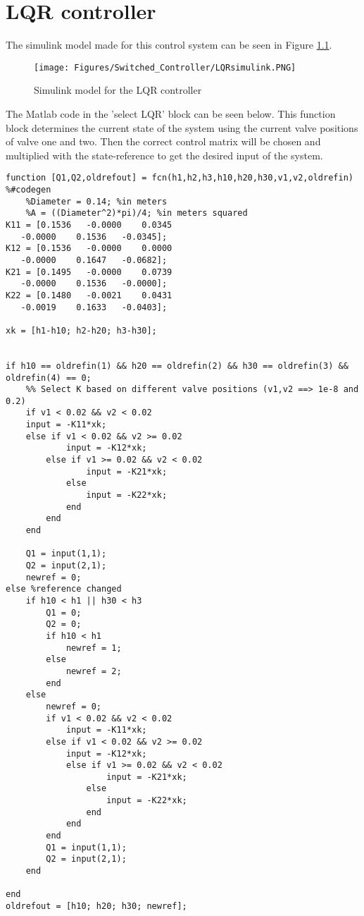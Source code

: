 \chapter{LQR controller} \label{App:LQR}
The simulink model made for this control system can be seen in Figure \ref{fig:LQRsim}.

\begin{figure} [H]
  \begin{center}
    \texttt{[image: Figures/Switched\_Controller/LQRsimulink.PNG]}
    \caption{Simulink model for the LQR controller}
    \label{fig:LQRsim}
  \end{center}
\end{figure}

The Matlab code in the 'select LQR' block can be seen below. This function block determines the current state of the system using the current valve positions of valve one and two. Then the correct control matrix will be chosen and multiplied with the state-reference to get the desired input of the system.

\begin{lstlisting}
function [Q1,Q2,oldrefout] = fcn(h1,h2,h3,h10,h20,h30,v1,v2,oldrefin)
%#codegen
    %Diameter = 0.14; %in meters
    %A = ((Diameter^2)*pi)/4; %in meters squared
K11 = [0.1536   -0.0000    0.0345
   -0.0000    0.1536   -0.0345];
K12 = [0.1536   -0.0000    0.0000
   -0.0000    0.1647   -0.0682];
K21 = [0.1495   -0.0000    0.0739
   -0.0000    0.1536   -0.0000];
K22 = [0.1480   -0.0021    0.0431
   -0.0019    0.1633   -0.0403];

xk = [h1-h10; h2-h20; h3-h30];


if h10 == oldrefin(1) && h20 == oldrefin(2) && h30 == oldrefin(3) && oldrefin(4) == 0;
    %% Select K based on different valve positions (v1,v2 ==> 1e-8 and 0.2)
    if v1 < 0.02 && v2 < 0.02
    input = -K11*xk;
    else if v1 < 0.02 && v2 >= 0.02
            input = -K12*xk;
        else if v1 >= 0.02 && v2 < 0.02
                input = -K21*xk;
            else
                input = -K22*xk;
            end
        end
    end

    Q1 = input(1,1);
    Q2 = input(2,1);
    newref = 0;
else %reference changed
    if h10 < h1 || h30 < h3
        Q1 = 0;
        Q2 = 0;
        if h10 < h1
            newref = 1;
        else
            newref = 2;
        end
    else
        newref = 0;
        if v1 < 0.02 && v2 < 0.02
            input = -K11*xk;
        else if v1 < 0.02 && v2 >= 0.02
            input = -K12*xk;
            else if v1 >= 0.02 && v2 < 0.02
                    input = -K21*xk;
                else
                    input = -K22*xk;
                end
            end
        end
        Q1 = input(1,1);
        Q2 = input(2,1);
    end
    
end
oldrefout = [h10; h20; h30; newref];
\end{lstlisting}


